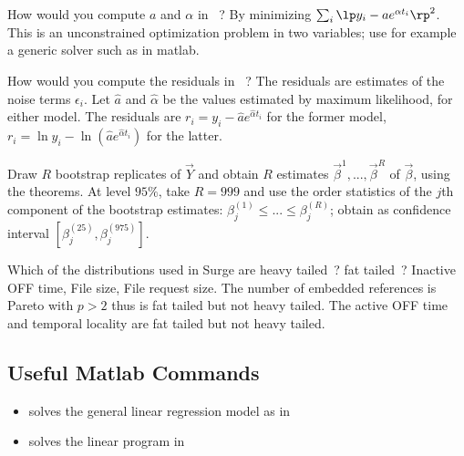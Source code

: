  {How would you compute $a$ and  $\alpha$ in ~?}
 {By minimizing $\sum_i \lp y_i
 -a e^{\alpha t_i} \rp ^2$. This is an unconstrained optimization problem in two variables;
 use for example a generic solver such as  in matlab.
 }

 {How would you compute the residuals in ~?}
 {The
residuals are estimates of the noise terms $\epsilon_i$. Let
$\hat{a}$ and $\hat{\alpha}$ be the values estimated by maximum
likelihood, for either model. The residuals are $r_i= y_i
-\hat{a} e^{\hat{\alpha} t_i}$ for the former model, $r_i= \ln
y_i -\ln\left(\hat{a} e^{\hat{\alpha} t_i}\right)$ for the
latter. }

 {Draw $R$ bootstrap replicates of
$\vec{Y}$ and obtain $R$ estimates
$\vec{\beta}^1,...,\vec{\beta}^R$ of $\vec{\beta}$, using the
theorems. At level $95\%$, take $R=99 9$ and use the order
statistics of the $j$th component of the bootstrap estimates:
$\beta_j^{(1)}\leq ...\leq \beta_j^{(R)}$; obtain as confidence
interval $[\beta_j^{(25)}, \beta_j^{(975)}]$.}





 {Which of the distributions used in Surge are heavy tailed~? fat tailed~?}
 {Inactive OFF time, File size, File request size. The number of embedded references is Pareto with $p >2$ thus is
fat tailed but
 not heavy tailed. The active OFF time and temporal locality are fat tailed but not heavy tailed.}

\subsection{Useful Matlab Commands}
\begin{itemize}
 \item {} solves the general linear regression model as in
 \item {} solves the linear program in
\end{itemize}
